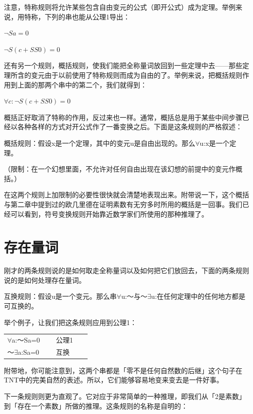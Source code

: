 \documentclass[
  12pt,
  twoside,
  openright,
  oldfontcommands,
]{memoir}
\begin{document}
注意，特称规则将允许某些包含自由变元的公式（即开公式）成为定理。举例来说，用特称，下列的串也能从公理1导出：

$\lnot Sa=0$

$\lnot S(c+SS0)=0$

还有另一个规则，概括规则，使我们能把全称量词放回到一些定理中去------那些定理所含的变元由于以前使用了特称规则而成为自由的了。举例来说，把概括规则作用到上面的那两个串中的第二个，我们就得到：

$\forall c:\lnot S(c+SS0)=0$

概括正好取消了特称的作用，反过来也一样。通常，概括总是用于某些中间步骤已经以各种各样的方式对开公式作了一番变换之后。下面是这条规则的严格叙述：

概括规则：假设x是一个定理，其中的变元u是自由出现的。那么$\forall$u:x是一个定理。

（限制：在一个幻想里面，不允许对任何自由出现在该幻想的前提中的变元作概括。）

在这两个规则上加限制的必要性很快就会清楚地表现出来。附带说一下，这个概括与第二章中提到过的欧几里德在证明素数有无穷多时所用的概括是一回事。我们已经可以看到，符号变换规则开始靠近数学家们所使用的那种推理了。

\section{存在量词}

刚才的两条规则说的是如何取走全称量词以及如何把它们放回去，下面的两条规则说的是如何处理存在量词。

互换规则：假设u是一个变元。那么串$\forall$u:～与～$\exists$u:在任何定理中的任何地方都是可互换的。

举个例子，让我们把这条规则应用到公理1：

\begin{longtable}[]{>{\raggedright\arraybackslash}p{0.47\linewidth} >{\raggedright\arraybackslash}p{0.47\linewidth}}
\toprule\noalign{}
\endhead
\bottomrule\noalign{}
\endlastfoot
$\forall$a:～Sa=0 & 　公理1 \\
～$\exists$a:Sa=0 & 　互换 \\
\end{longtable}

附带地，你可能注意到，这两个串都是「零不是任何自然数的后继」这个句子在TNT中的完美自然的表述。所以，它们能够容易地变来变去是一件好事。

下一条规则则更为直观了。它对应于非常简单的一种推理，即我们从「2是素数」到「存在一个素数」所做的推理。这条规则的名称是自明的：
\end{document}
